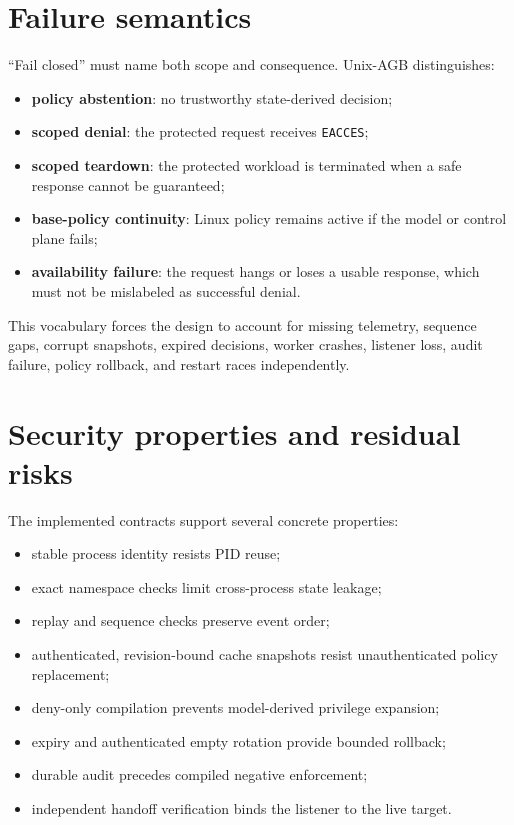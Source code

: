 \documentclass[11pt,a4paper]{article}
\begin{document}
\section{Failure semantics}

``Fail closed'' must name both scope and consequence. Unix-AGB distinguishes:

\begin{itemize}[leftmargin=*]
  \item \textbf{policy abstention}: no trustworthy state-derived decision;
  \item \textbf{scoped denial}: the protected request receives
        \texttt{EACCES};
  \item \textbf{scoped teardown}: the protected workload is terminated when a
        safe response cannot be guaranteed;
  \item \textbf{base-policy continuity}: Linux policy remains active if the
        model or control plane fails;
  \item \textbf{availability failure}: the request hangs or loses a usable
        response, which must not be mislabeled as successful denial.
\end{itemize}

This vocabulary forces the design to account for missing telemetry, sequence
gaps, corrupt snapshots, expired decisions, worker crashes, listener loss,
audit failure, policy rollback, and restart races independently.

\section{Security properties and residual risks}

The implemented contracts support several concrete properties:

\begin{itemize}[leftmargin=*]
  \item stable process identity resists PID reuse;
  \item exact namespace checks limit cross-process state leakage;
  \item replay and sequence checks preserve event order;
  \item authenticated, revision-bound cache snapshots resist unauthenticated
        policy replacement;
  \item deny-only compilation prevents model-derived privilege expansion;
  \item expiry and authenticated empty rotation provide bounded rollback;
  \item durable audit precedes compiled negative enforcement;
  \item independent handoff verification binds the listener to the live target.
\end{itemize}
\end{document}
